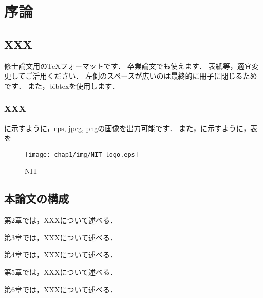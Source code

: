 \chapter{序論}
\section{XXX}
修士論文用のTeXフォーマットです．
卒業論文でも使えます．
表紙等，適宜変更してご活用ください．
左側のスペースが広いのは最終的に冊子に閉じるためです．
また，bibtexを使用します\cite{NIPS2017_3f5ee243}．

\subsection{XXX}
に示すように，eps, jpeg, pngの画像を出力可能です．
また，に示すように，表を

\begin{figure}[htbp]
  \centering
  \texttt{[image: chap1/img/NIT\_logo.eps]}
	\caption{NIT}
	\label{fig:NIT}
\end{figure}

\begin{table}[H]
  \centering
  \caption{Sample Table}
  \label{tab:sample-table}
\end{table}

\section{本論文の構成}
第2章では，XXXについて述べる．

第3章では，XXXについて述べる．

第4章では，XXXについて述べる．

第5章では，XXXについて述べる．

第6章では，XXXについて述べる．

